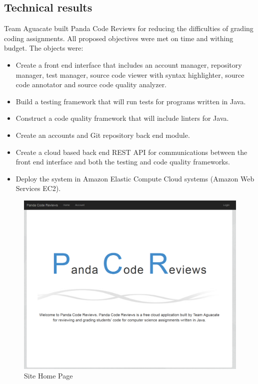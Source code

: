 \subsection{Technical results}
Team Aguacate built Panda Code Reviews for reducing the difficulties of grading coding
assignments. All proposed objectives were met on time and withing budget. The objects were:

\begin{itemize}
\item Create a front end interface that includes an account manager, repository
manager, test manager, source code viewer with syntax highlighter, source code
annotator and source code quality analyzer.

\item Build a testing framework that will run tests for programs written in
Java.

\item Construct a code quality framework that will include linters for Java.

\item Create an accounts and Git repository back end module.

\item Create a cloud based back end REST API for communications between the
front end interface and both the testing and code quality frameworks.

\item Deploy the system in Amazon Elastic Compute Cloud systems (Amazon Web
Services EC2).

\end{itemize}

\begin{figure}[H]
	\centering
	\includegraphics[width=\textwidth]{img/home-screen}
	\caption{Site Home Page}
\end{figure}

